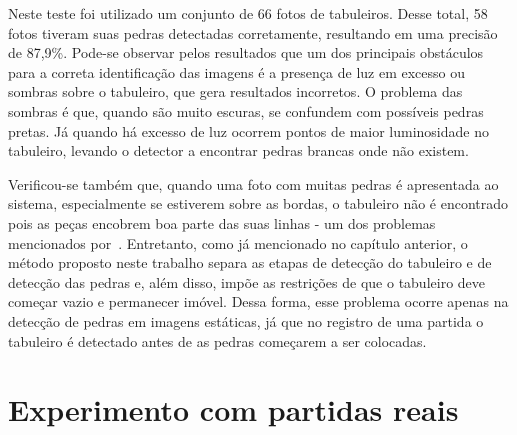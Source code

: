
Neste teste foi utilizado um conjunto de 66 fotos de tabuleiros. Desse total, 58 fotos tiveram suas pedras detectadas corretamente, resultando em uma precisão de 87,9\%. 
Pode-se observar pelos resultados que um dos principais obstáculos para a correta identificação das imagens é a presença de luz em excesso ou sombras sobre o tabuleiro, que gera resultados incorretos. O problema das sombras é que, quando são muito escuras, se confundem com possíveis pedras pretas. Já quando há excesso de luz ocorrem pontos de maior luminosidade no tabuleiro, levando o detector a encontrar pedras brancas onde não existem.

Verificou-se também que, quando uma foto com muitas pedras é apresentada ao sistema, especialmente se estiverem sobre as bordas, o tabuleiro não é encontrado pois as peças encobrem boa parte das suas linhas - um dos problemas mencionados por~. Entretanto, como já mencionado no capítulo anterior, o método proposto neste trabalho separa as etapas de detecção do tabuleiro e de detecção das pedras e, além disso, impõe as restrições de que o tabuleiro deve começar vazio e permanecer imóvel. Dessa forma, esse problema ocorre apenas na detecção de pedras em imagens estáticas, já que no registro de uma partida o tabuleiro é detectado antes de as pedras começarem a ser colocadas.

\section{Experimento com partidas reais}

